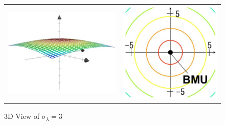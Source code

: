 \begin{figure}[H]%
    \begin{tabular}{cc}
      \begin{minipage}[t]{0.45\hsize}
        \centering
        \includegraphics[keepaspectratio, scale=0.8]{Figure/Sigma_3_3D.eps}
        \caption{3D View of $\sigma_\lambda =3 $}
        \label{fig:Sigma_3_3D}
      \end{minipage} &
      \begin{minipage}[t]{0.45\hsize}
        \centering
        \includegraphics[keepaspectratio, scale=0.8]{Figure/Sigma_3_2D.eps}

\end{minipage}
\end{tabular}
\end{figure}
